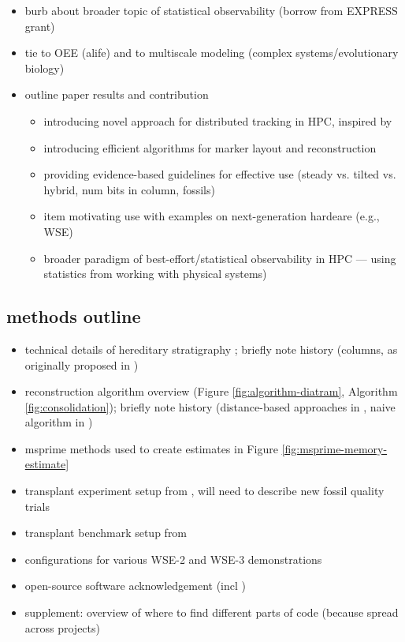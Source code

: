 \begin{itemize}
\begin{itemize}
   \end{itemize}
\item burb about broader topic of statistical observability (borrow from EXPRESS grant)
\item tie to OEE (alife) and to multiscale modeling (complex systems/evolutionary biology)
\item outline paper results and contribution
   \begin{itemize}
   \item introducing novel approach for distributed tracking in HPC, inspired by
   \item introducing efficient algorithms for marker layout and reconstruction
   \item providing evidence-based guidelines for effective use (steady vs. tilted vs. hybrid, num bits in column, fossils)
   \item item motivating use with examples on next-generation hardeare (e.g., WSE)
   \item broader paradigm of best-effort/statistical observability in HPC --- using statistics from working with physical systems)
   \end{itemize}
\end{itemize}

\subsection{methods outline}

\begin{itemize}
\item technical details of hereditary stratigraphy \citep{moreno2024algorithms}; briefly note history (columns, as originally proposed in \citep{moreno2022hereditary})
\item reconstruction algorithm overview (Figure \ref{fig:algorithm-diatram}, Algorithm \ref{fig:consolidation}); briefly note history (distance-based approaches in \citep{moreno2022hereditary}, naive algorithm in \citep{moreno2023toward})
\item msprime methods used to create estimates in Figure \ref{fig:msprime-memory-estimate}
\item transplant experiment setup from \citep{moreno2025testing}, will need to describe new fossil quality trials
\item transplant benchmark setup from \citep{singhvi2025scalable}
\item configurations for various WSE-2 and WSE-3 demonstrations
\item open-source software acknowledgement (incl \citep{zanini2025unified})
\item supplement: overview of where to find different parts of code (because spread across projects)
\end{itemize}

